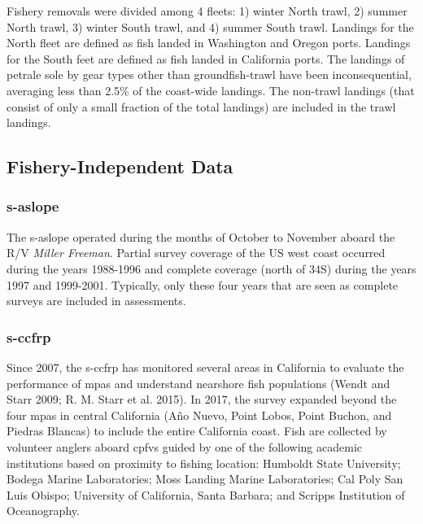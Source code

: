 \documentclass[11pt,
  english,
  letterpaper,
]{article}
\begin{document}
Fishery removals were divided among 4 fleets: 1) winter North trawl, 2) summer North trawl, 3) winter South trawl, and 4) summer South trawl. Landings for the North fleet are defined as fish landed in Washington and Oregon ports. Landings for the South feet are defined as fish landed in California ports. The landings of petrale sole by gear types other than groundfish-trawl have been inconsequential, averaging less than 2.5\% of the coast-wide landings. The non-trawl landings (that consist of only a small fraction of the total landings) are included in the trawl landings.

\hypertarget{fishery-independent-data}{%
\subsection{Fishery-Independent Data}\label{fishery-independent-data}}

\hypertarget{section}{%
\subsubsection{\texorpdfstring{\acrlong{s-aslope}}{}}\label{section}}

The \gls{s-aslope} operated during the months of October to November aboard the R/V \emph{Miller Freeman}. Partial survey coverage of the US west coast occurred during the years 1988-1996 and complete coverage (north of 34\textquotesingle S) during the years 1997 and 1999-2001. Typically, only these four years that are seen as complete surveys are included in assessments.

\hypertarget{section-1}{%
\subsubsection{\texorpdfstring{\acrlong{s-ccfrp}}{}}\label{section-1}}

Since 2007, the \gls{s-ccfrp} has monitored several areas in California to evaluate the performance of \glspl{mpa} and understand nearshore fish populations (Wendt and Starr 2009; R. M. Starr et al. 2015). In 2017, the survey expanded beyond the four \Gls{mpa}s in central California (Año Nuevo, Point Lobos, Point Buchon, and Piedras Blancas) to include the entire California coast. Fish are collected by volunteer anglers aboard \glspl{cpfv} guided by one of the following academic institutions based on proximity to fishing location: Humboldt State University; Bodega Marine Laboratories; Moss Landing Marine Laboratories; Cal Poly San Luis Obispo; University of California, Santa Barbara; and Scripps Institution of Oceanography.
\end{document}
